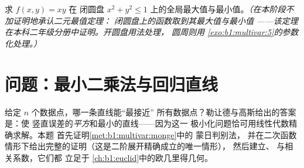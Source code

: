 \begin{exercise}[$\star\star\star$]\label{exo:b1:multivar:12}
求 $f(x, y) = xy$ 在
闭圆盘 $x^2 + y^2 \leq 1$ 上的全局最大值与最小值。\emph{（在本阶段不加证明地承认二元最值定理：
闭圆盘上的函数取到其最大值与最小值
——该定理在本科二年级分册中证明。开圆盘用法处理，
圆周则用
\cref{exo:b1:multivar:5}的参数化处理。）}
\end{exercise}

\section{问题：最小二乘法与回归直线}

\begin{problem}\label{pb:b1:multivar:1}
给定 $n$ 个数据点，哪一条直线能“最接近”
所有数据点？勒让德与高斯给出的答案是：使
竖直误差的\emph{平方}和最小的直线——因为这一
极小化问题恰可用线性代数精确求解。本题
首先证明\cref{met:b1:multivar:monge}中的 蒙日判别法，
并在二次函数情形下给出完整的证明（这是二阶展开精确成立的唯一情形），
然后建立、
与相关系数，它们都
立足于
\cref{ch:b1:euclid}中的欧几里得几何。


\end{problem}
